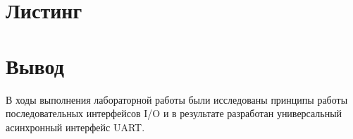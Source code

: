 \documentclass[a4paper, 10pt]{article}
\begin{document}
     \section*{Листинг}
        
        
        
        
        
        
        

    \section*{Вывод}
        В ходы выполнения лабораторной работы были исследованы принципы работы
        последовательных интерфейсов I/O и в результате разработан универсальный
        асинхронный интерфейс UART.
\end{document}
